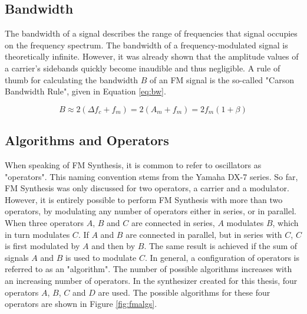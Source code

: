   \subsection{Bandwidth}

  The bandwidth of a signal describes the range of frequencies that signal occupies on the frequency spectrum. The bandwidth of a frequency-modulated signal is theoretically infinite. However, it was already shown that the amplitude values of a carrier's sidebands quickly become inaudible and thus negligible. A rule of thumb for calculating the bandwidth $B$ of an FM signal is the so-called "Carson Bandwidth Rule", given in Equation \ref{eq:bw}.

  \begin{equation}
    B \approx 2(\Delta f_{c} + f_{m}) = 2(A_{m} + f_{m}) = 2f_{m}(1 + \beta)
    \label{eq:bw}
  \end{equation}

  \subsection{Algorithms and Operators}

  When speaking of FM Synthesis, it is common to refer to oscillators as "operators". This naming convention stems from the Yamaha DX-7 series. So far, FM Synthesis was only discussed for two operators, a carrier and a modulator. However, it is entirely possible to perform FM Synthesis with more than two operators, by modulating any number of operators either in series, or in parallel. When three operators $A$, $B$ and $C$ are connected in series, $A$ modulates $B$, which in turn modulates $C$. If $A$ and $B$ are connected in parallel, but in series with $C$, $C$ is first modulated by $A$ and then by $B$. The same result is achieved if the sum of signals $A$ and $B$ is used to modulate $C$. In general, a configuration of operators is referred to as an "algorithm". The number of possible algorithms increases with an increasing number of operators. In the synthesizer created for this thesis, four operators $A$, $B$, $C$ and $D$ are used. The possible algorithms for these four operators are shown in Figure \ref{fig:fmalgs}.

